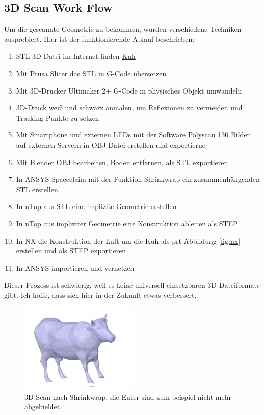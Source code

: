 \documentclass[a4paper,12pt]{article}
\begin{document}
\subsection{3D Scan Work Flow}
Um die gescannte Geometrie zu bekommen, wurden verschiedene Techniken ausprobiert. Hier ist der funktionierende Ablauf beschrieben:
\begin{enumerate}
    \item STL 3D-Datei im Internet finden \href{https://www.printables.com/de/model/175429-cow}{Kuh}
    \item Mit Prusa Slicer das STL in G-Code übersetzen
    \item Mit 3D-Drucker Ultimaker 2+ G-Code in physisches Objekt umwandeln
    \item 3D-Druck weiß und schwarz anmalen, um Reflexionen zu vermeiden und Tracking-Punkte zu setzen
    \item Mit Smartphone und externen LEDs mit der Software Polyscan 130 Bilder auf externen Servern in OBJ-Datei erstellen und exportierne
    \item Mit Blender OBJ bearbeiten, Boden entfernen, als STL exportieren
    \item In ANSYS Spaceclaim mit der Funktion Shrinkwrap ein zusammenhängenden STL erstellen
    \item In nTop aus STL eine implizite Geometrie erstellen
    \item In nTop aus impliziter Geometrie eine Konstruktion ableiten als STEP
    \item In NX die Konstruktion der Luft um die Kuh als prt Abbildung \ref{fig:nx} erstellen und als STEP exportieren
    \item In ANSYS importieren und vernetzen  
\end{enumerate}
Dieser Prozess ist schwierig, weil es keine universell einsetzbaren 3D-Dateiformate gibt. Ich hoffe, dass sich hier in der Zukunft etwas verbessert.


\begin{figure}[h]
    \centering
    \includegraphics[width=0.5\textwidth]{cew.PNG}
    \caption{3D Scan nach Shrinkwrap, die Euter sind zum beispiel nicht mehr abgebieldet}
    \label{fig:scangeometry}
\end{figure}
\end{document}
